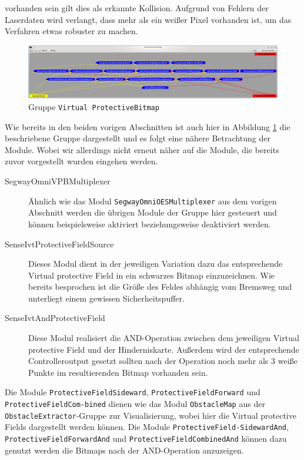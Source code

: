  vorhanden sein gilt dies als erkannte Kollision. Aufgrund von Fehlern der Laserdaten wird verlangt, dass mehr als ein
 weißer Pixel vorhanden ist, um das Verfahren etwas robuster zu machen.
\begin{figure}[h]
\center
\includegraphics[scale=0.29]{graphics/VirtualProtectiveBitmap.jpg}
\caption{\label{fig:virtualprotectivebitmap} Gruppe \lstinline{Virtual
ProtectiveBitmap}}
\end{figure}
 Wie bereits in den beiden vorigen Abschnitten  ist auch hier in Abbildung
 \ref{fig:virtualprotectivebitmap} die beschriebene Gruppe dargestellt und es
 folgt eine nähere Betrachtung der Module.
 Wobei wir allerdings nicht erneut näher auf die Module, die bereits zuvor
 vorgestellt wurden eingehen werden.

\begin{description}
\item[SegwayOmniVPBMultiplexer] Ähnlich wie das Modul
\lstinline{SegwayOmniOESMultiplexer} aus dem vorigen Abschnitt werden die
 übrigen Module der Gruppe hier gesteuert und können beispielsweise aktiviert
 beziehungsweise deaktiviert werden.
\item[SenseIvtProtectiveFieldSource] Dieses Modul dient in der jeweiligen
Variation dazu das entsprechende Virtual protective Field in ein schwarzes
Bitmap einzuzeichnen. Wie bereits besprochen ist die Größe des Feldes abhängig
vom Bremsweg und unterliegt einem gewissen Sicherheitspuffer.
\item[SenseIvtAndProtectiveField]  Diese Modul realisiert die AND-Operation zwischen dem jeweiligen
 Virtual protective Field und der Hinderniskarte. Außerdem wird der entsprechende Controlleroutput gesetzt
 sollten nach der Operation noch mehr als 3 weiße Punkte im resultierenden Bitmap vorhanden sein.
\end{description}

Die Module \lstinline{ProtectiveFieldSideward},
 \lstinline{ProtectiveFieldForward} und
 \lstinline{ProtectiveFieldCom-}\lstinline{bined} dienen wie das Modul
 \lstinline{ObstacleMap} aus der \lstinline{ObstacleExtractor}-Gruppe zur Visualisierung, wobei hier die Virtual
 protective Fields dargestellt werden können. Die Module 
 \lstinline{ProtectiveField-}\lstinline{SidewardAnd},
 \lstinline{ProtectiveFieldForwardAnd} und \lstinline{ProtectiveFieldCombinedAnd} können dazu genutzt werden die
 Bitmaps nach der AND-Operation anzuzeigen.
